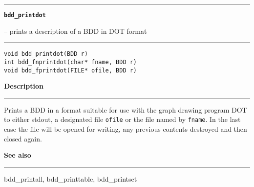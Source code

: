 \begin{minipage}{\textwidth}

\noindent\begin{minipage}{\textwidth}
\rule{\textwidth}{0.5mm}
{\tt\bf bdd\_printdot }
\--- prints a description of a BDD in DOT format  \hspace{\fill}
\\\rule[1.5ex]{\textwidth}{0.5mm}
\end{minipage}

\noindent\begin{verbatim}
void bdd_printdot(BDD r)
int bdd_fnprintdot(char* fname, BDD r)
void bdd_fprintdot(FILE* ofile, BDD r) 
\end{verbatim}

\vspace{\parsep}\noindent
{\bf Description}\\\rule[1.5ex]{\textwidth}{0.2mm}\vspace{-1.5ex}\setlength{\parindent}{1em}
Prints a BDD in a format suitable for use with the graph
           drawing program DOT to either stdout, a designated file
	   {\tt ofile} or the file named by {\tt fname}. In the last case
	   the file will be opened for writing, any previous contents
	   destroyed and then closed again. 

\vspace{\parsep}\vspace{\baselineskip}\noindent
{\bf See also}\\\rule[1.5ex]{\textwidth}{0.2mm}\vspace{-1.5ex}
bdd\_printall, bdd\_printtable, bdd\_printset 
\end{minipage}
\vspace{8ex}

